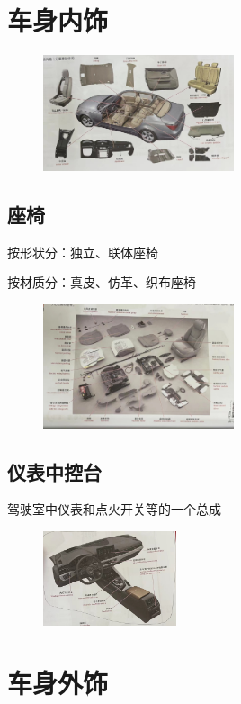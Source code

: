 \clearpage
\section{车身内饰}
	\begin{figure}[htbp]
		\centering
		\includegraphics[width=0.5\textwidth]{4-5}
	\end{figure}
\subsection{座椅}
	按形状分：独立、联体座椅
	
	按材质分：真皮、仿革、织布座椅
	\begin{figure}[htbp]
		\centering
		\includegraphics[width=0.5\textwidth]{4-6}
	\end{figure}
\subsection{仪表中控台}
	驾驶室中仪表和点火开关等的一个总成
	\begin{figure}[htbp]
		\centering
		\includegraphics[width=0.35\textwidth]{4-7}
	\end{figure}
\clearpage
\section{车身外饰}

